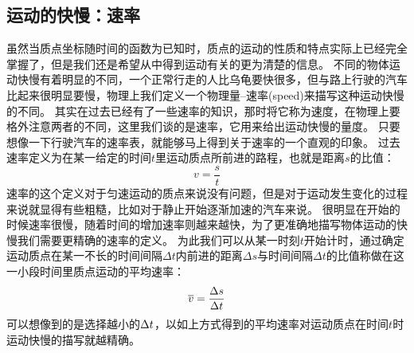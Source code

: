 \subsection{运动的快慢：速率}
虽然当质点坐标随时间的函数为已知时，质点的运动的性质和特点实际上已经完全掌握了，但是我们还是希望从中得到运动有关的更为清楚的信息。
不同的物体运动快慢有着明显的不同，一个正常行走的人比乌龟要快很多，但与路上行驶的汽车比起来很明显要慢，物理上我们定义一个物理量--{\heiti 速率(speed)}来描写这种运动快慢的不同。
其实在过去已经有了一些速率的知识，那时将它称为速度，在物理上要格外注意两者的不同，这里我们谈的是速率，它用来给出运动快慢的量度。
只要想像一下行驶汽车的速率表，就能够马上得到关于速率的一个直观的印象。
过去速率定义为在某一给定的时间$ t$里运动质点所前进的路程，也就是距离$ s$的比值：
\begin{equation}
v = \frac{s}{ t}
\end{equation}
速率的这个定义对于匀速运动的质点来说没有问题，但是对于运动发生变化的过程来说就显得有些粗糙，比如对于静止开始逐渐加速的汽车来说。
很明显在开始的时候速率很慢，随着时间的增加速率则越来越快，为了更准确地描写物体运动的快慢我们需要更精确的速率的定义。
为此我们可以从某一时刻$t$开始计时，通过确定运动质点在某一不长的时间间隔$\Delta t$内前进的距离$\Delta s$与时间间隔$\Delta t$的比值称做在这一小段时间里质点运动的平均速率：
\begin{equation}\label{eqn: motion-平均速率的定义}
\overline{v} = \frac{\Delta s}{\Delta t}
\end{equation}
可以想像到的是选择越小的$\Delta t$，以如上方式得到的平均速率对运动质点在时间$t$时运动快慢的描写就越精确。

